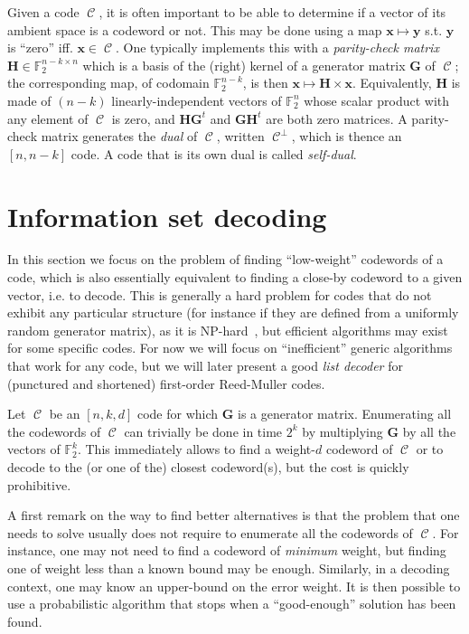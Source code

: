 \documentclass[11pt,a4paper]{article}
\theoremstyle{definition}
\DeclareMathOperator\code{\mathcal{C}}
\newcommand\ftwo{\mathbb{F}_{2}}
\begin{document}
\medskip

Given a code $\code$, it is often important to be able to determine if a vector of its ambient space is a codeword or not.
This may be done using a map $\bm{x} \mapsto \bm{y}$ s.t. $\bm{y}$ is ``zero'' iff. $\bm{x} \in \code$. One typically implements this with a \emph{parity-check matrix} $\bm{H} \in \ftwo^{n-k\times n}$
which is a basis of the (right) kernel of a generator matrix $\bm{G}$ of $\code$; the corresponding map, of codomain $\ftwo^{n-k}$, is then $\bm{x} \mapsto \bm{H}\times\bm{x}$. Equivalently, $\bm{H}$ is made of $(n-k)$ linearly-independent vectors of $\ftwo^n$ whose scalar product with any element of $\code$ is zero, and $\bm{H}\bm{G}^t$ and
$\bm{G}\bm{H}^t$ are both zero matrices. A parity-check matrix generates the \emph{dual} of $\code$, written $\code^\bot$, which is thence an $[n,n-k]$ code. A code that is its own dual is called \emph{self-dual}.

\section{Information set decoding}

In this section we focus on the problem of finding ``low-weight'' codewords of  a code, which is also essentially equivalent to finding a close-by codeword to a given vector, i.e. to decode.
This is generally a hard problem for codes that do not exhibit any particular structure (for instance if they are defined from a uniformly random generator matrix), as it is NP-hard~\cite{codeshard}, but efficient algorithms may exist for some specific codes. For now we will focus on
``inefficient'' generic algorithms that work for any code, but we will later present a good \emph{list decoder} for (punctured and shortened) first-order Reed-Muller codes.

\smallskip

Let $\code$ be an $[n,k,d]$ code for which $\bm{G}$ is a generator matrix. Enumerating all the codewords of $\code$ can trivially be done in time $2^k$ by multiplying $\bm{G}$ by all the vectors of $\ftwo^k$. This immediately allows to find
a weight-$d$ codeword of $\code$ or to decode to the (or one of the) closest codeword(s),
but the cost is quickly prohibitive.

A first remark on the way to find better alternatives is that the problem that one needs to solve usually does not require to enumerate all the codewords of $\code$. For instance, one may not need to find a codeword of \emph{minimum} weight,
but finding one of weight less than a known bound may be enough. Similarly, in a decoding context, one may know an upper-bound on the error weight. It is then possible to use a probabilistic algorithm that stops when a ``good-enough''
solution has been found.
\end{document}
